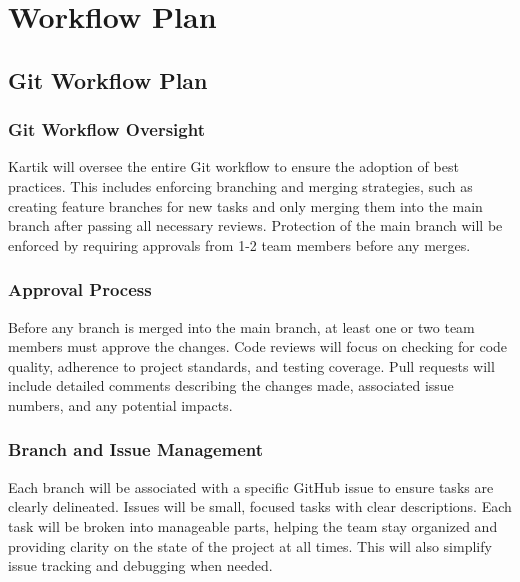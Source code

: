 \documentclass{article}
\begin{document}
\section{Workflow Plan}


\subsection{Git Workflow Plan}

\subsubsection{Git Workflow Oversight} 
Kartik will oversee the entire Git workflow to ensure the adoption of best practices. This includes enforcing branching and merging strategies, such as creating feature branches for new tasks and only merging them into the main branch after passing all necessary reviews. Protection of the main branch will be enforced by requiring approvals from 1-2 team members before any merges.

\subsubsection{Approval Process} 
Before any branch is merged into the main branch, at least one or two team members must approve the changes. Code reviews will focus on checking for code quality, adherence to project standards, and testing coverage. Pull requests will include detailed comments describing the changes made, associated issue numbers, and any potential impacts.

\subsubsection{Branch and Issue Management} 
Each branch will be associated with a specific GitHub issue to ensure tasks are clearly delineated. Issues will be small, focused tasks with clear descriptions. Each task will be broken into manageable parts, helping the team stay organized and providing clarity on the state of the project at all times. This will also simplify issue tracking and debugging when needed.
\end{document}

